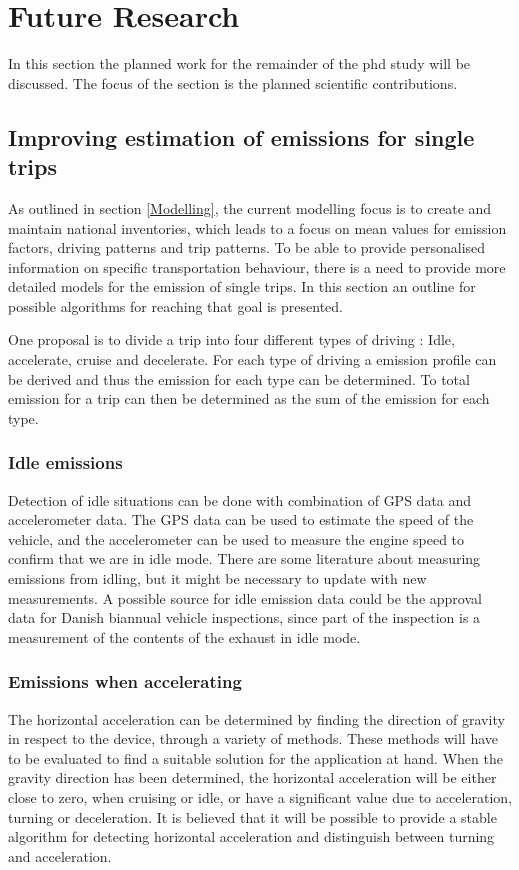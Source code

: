 \section{Future Research}
In this section the planned work for the remainder of the phd study will be discussed. The focus of the section is the planned scientific contributions.

\subsection{Improving estimation of emissions for single trips}
As outlined in section \ref{Modelling}, the current modelling focus is to create and maintain national inventories, which leads to a focus on mean values for emission factors, driving patterns and trip patterns. To be able to provide personalised information on specific transportation behaviour, there is a need to provide more detailed models for the emission of single trips. In this section an outline for possible algorithms for reaching that goal is presented.

One proposal is to divide a trip into four different types of driving : Idle, accelerate, cruise and decelerate. For each type of driving a emission profile can be derived and thus the emission for each type can be determined. To total emission for a trip can then be determined as the sum of the emission for each type.

\subsubsection{Idle emissions}\label{Idle}
Detection of idle situations can be done with combination of GPS data and accelerometer data. The GPS data can be used to estimate the speed of the vehicle, and the accelerometer can be used to measure the engine speed to confirm that we are in idle mode. There are some literature about measuring emissions from idling, but it might be necessary to update with new measurements. A possible source for idle emission data could be the approval data for Danish biannual vehicle inspections, since part of the inspection is a measurement of the contents of the exhaust in idle mode.

\subsubsection{Emissions when accelerating}
The horizontal acceleration can be determined by finding the direction of gravity in respect to the device, through a variety of methods. These methods will have to be evaluated to find a suitable solution for the application at hand.
When the gravity direction has been determined, the horizontal acceleration will be either close to zero, when cruising or idle, or have a significant value due to acceleration, turning or deceleration. It is believed that it will be possible to provide a stable algorithm for detecting horizontal acceleration and distinguish between turning and acceleration.

